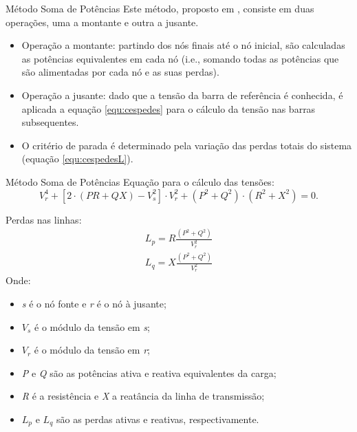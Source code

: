 \documentclass[10pt]{beamer}
\begin{document}
\begin{frame}{Método Soma de Potências}
    Este método, proposto em \citep{Cespedes}, consiste em duas operações, uma a montante e outra a jusante. 
    
    \begin{itemize}
        \item Operação a montante: partindo dos nós finais até o nó inicial, são calculadas as potências equivalentes em cada nó (i.e., somando todas as potências que são alimentadas por cada nó e as suas perdas).
        
        \item Operação a jusante: dado que a tensão da barra de referência é conhecida, é aplicada a equação \ref{equ:cespedes} para o cálculo da tensão nas barras subsequentes.
        
        \item O critério de parada é determinado pela variação das perdas totais do sistema (equação \ref{equ:cespedesL}).
    \end{itemize}
\end{frame}

\begin{frame}{Método Soma de Potências}
    Equação para o cálculo das tensões:
    \begin{equation}
    \label{equ:cespedes}
    V_r^4 + [2 \cdot (PR+QX) -V_s^2] \cdot V_r^2 + (P^2 + Q^2) \cdot (R^2 + X^2) = 0.
    \end{equation}
    
    Perdas nas linhas:
    \begin{eqnarray}
    \label{equ:cespedesL}
    L_p = R \frac{(P^2 + Q^2)}{V_r^2} \\
    L_q = X \frac{(P^2 + Q^2)}{V_r^2}
    \end{eqnarray}
    Onde:
    \begin{itemize}
        \item \emph{s} é o nó fonte e \emph{r} é o nó à jusante;
        \item \emph{$V_s$} é o módulo da tensão em \emph{s};
        \item \emph{$V_r$} é o módulo da tensão em \emph{r};
        \item \emph{P} e \emph{Q} são as potências ativa e reativa equivalentes da carga;
        \item \emph{R} é a resistência e \emph{X} a reatância da linha de transmissão;
        \item \emph{$L_p$} e \emph{$L_q$} são as perdas ativas e reativas, respectivamente.
    \end{itemize}
    
\end{frame}
\end{document}
